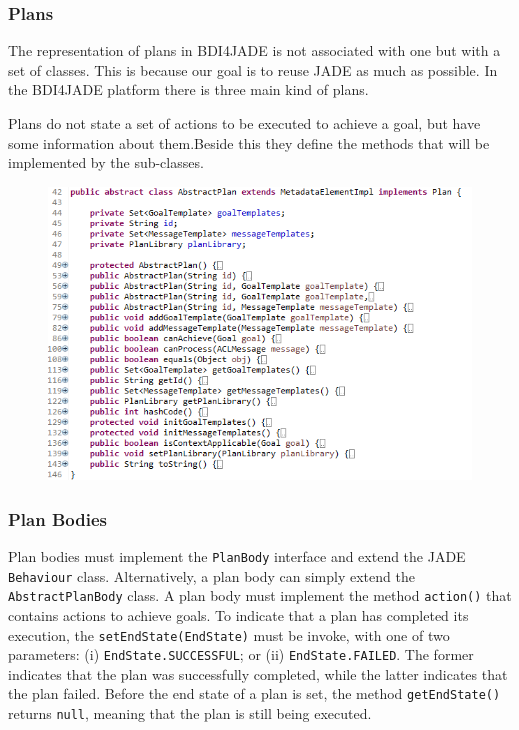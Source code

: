 \documentclass{article}
\begin{document}
\subsubsection{Plans}

The representation of plans in BDI4JADE is not associated with one but with a set of classes. This is because our goal is to reuse JADE as much as possible. In the BDI4JADE platform there is three main kind of plans.

Plans do not state a set of actions to be executed to achieve a goal, but have some information about them.Beside this they define the methods that will be implemented by the sub-classes.  

\begin{figure}[!h]
	\centering
	\includegraphics[width=\linewidth]{Plan}
	\label{fig:Plan}
\end{figure}

\subsubsection{Plan Bodies}

Plan bodies must implement the \texttt{PlanBody} interface and extend the JADE \texttt{Behaviour} class. Alternatively, a plan body can simply extend the \texttt{AbstractPlanBody} class. A plan body must implement the method \texttt{action()} that contains actions to achieve goals. To indicate that a plan has completed its execution, the \texttt{setEndState(EndState)} must be invoke, with one of two parameters: (i) \texttt{EndState.SUCCESSFUL}; or (ii) \texttt{EndState.FAILED}. The former indicates that the plan was successfully completed, while the latter indicates that the plan failed. Before the end state of a plan is set, the method \texttt{getEndState()} returns \texttt{null}, meaning that the plan is still being executed.
\end{document}
